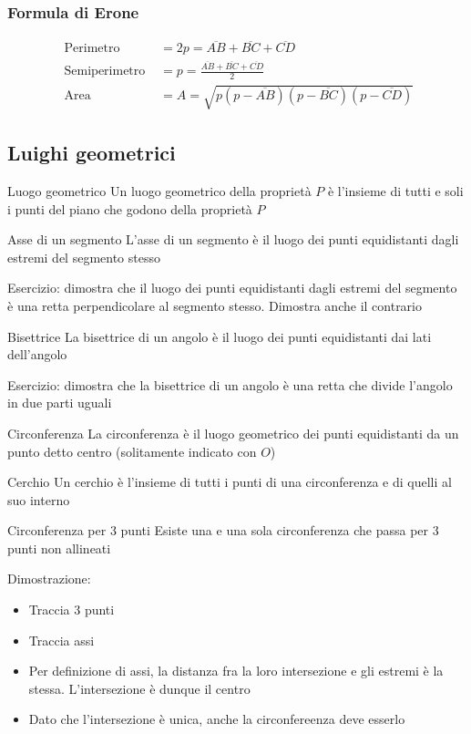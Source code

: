 \subsubsection{Formula di Erone}
\begin{align*}
	\text{ Perimetro }     & = 2p = \overline{AB} + \overline{BC} + \overline{CD}                                                      \\
	\text{ Semiperimetro } & = p = \frac{\overline{AB} + \overline{BC} + \overline{CD}}{2}                                             \\
	\text{ Area }          & = A =\sqrt{p\left(p - \overline{AB}\right) \left(p - \overline{BC} \right)\left(p - \overline{CD}\right)}
\end{align*}

\subsection{Luighi geometrici}
\begin{definizione}{Luogo geometrico}
	Un luogo geometrico della proprietà $ P $ è l'insieme di tutti e soli i punti del piano che godono della proprietà $ P $
\end{definizione}

\begin{definizione}{Asse di un segmento}
	L'asse di un segmento è il luogo dei punti equidistanti dagli estremi del segmento stesso
\end{definizione}
Esercizio: dimostra che il luogo dei punti equidistanti dagli estremi del segmento è una retta perpendicolare al segmento stesso. Dimostra anche il contrario
\begin{definizione}{Bisettrice}
	La bisettrice di un angolo è il luogo dei punti equidistanti dai lati dell'angolo
\end{definizione}
Esercizio: dimostra che la bisettrice di un angolo è una retta che divide l'angolo in due parti uguali


\begin{definizione}{Circonferenza}
	La circonferenza è il luogo geometrico dei punti equidistanti da un punto detto centro (solitamente indicato con $ O $)
\end{definizione}
\begin{definizione}{Cerchio}
	Un cerchio è l'insieme di tutti i punti di una circonferenza e di quelli al suo interno
\end{definizione}

\begin{teorema}{Circonferenza per 3 punti}
	Esiste una e una sola circonferenza che passa per 3 punti non allineati
\end{teorema}
Dimostrazione:
\begin{itemize}
	\item Traccia 3 punti
	\item Traccia assi
	\item Per definizione di assi, la distanza fra la loro intersezione e gli estremi è la stessa. L'intersezione è dunque il centro
	\item Dato che l'intersezione è unica, anche la circonfereenza deve esserlo
\end{itemize}

